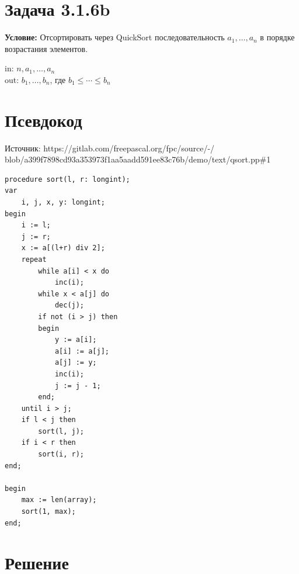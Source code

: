 \documentclass[12pt]{article}
\begin{document}
\section*{Задача 3.1.6b}

\textbf{Условие:} Отсортировать через QuickSort последовательность $a_1,\ldots,a_n$ в порядке возрастания элементов.

in: $n,a_1,\ldots,a_n$\\
out: $b_1,\ldots,b_n$, где $b_1\leq\cdots\leq b_n$

\section*{Псевдокод}
Источник: https://gitlab.com/freepascal.org/fpc/source/-/\\
blob/a399f7898cd93a353973f1aa5aadd591ee83c76b/demo/text/qsort.pp\#1
\begin{verbatim}
procedure sort(l, r: longint);
var
    i, j, x, y: longint;
begin
    i := l;
    j := r;
    x := a[(l+r) div 2];
    repeat
        while a[i] < x do
            inc(i);
        while x < a[j] do
            dec(j);
        if not (i > j) then
        begin
            y := a[i];
            a[i] := a[j];
            a[j] := y;
            inc(i);
            j := j - 1;
        end;
    until i > j;
    if l < j then
        sort(l, j);
    if i < r then
        sort(i, r);
end;

begin
    max := len(array);
    sort(1, max);
end;
\end{verbatim}

\section*{Решение}
\end{document}
